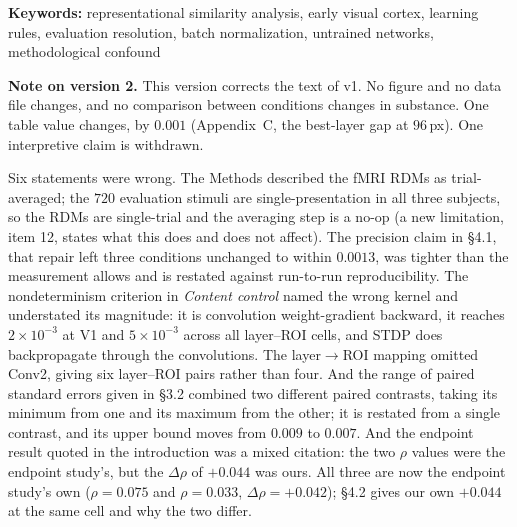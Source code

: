 \documentclass[10pt,twocolumn]{article}
\begin{document}
\begin{abstract}
data alone and is independent of any model; the second is specific to RSA on globally pooled features, and a fitted readout on the full feature map might place the models higher. What the pair bounds, then, is what this style of comparison can resolve at V1 in this dataset, not model--brain alignment in general. In this setting, the one learning effect that holds across resolution is backprop above untrained, at a higher area (LOC). Comparisons of learning rules or architectures at early visual cortex therefore need to control, and report, the evaluation resolution.
\end{abstract}

\textbf{Keywords:} representational similarity analysis, early visual cortex, learning rules, evaluation resolution, batch normalization, untrained networks, methodological confound

\textbf{Note on version 2.} This version corrects the text of v1. No figure and no data file changes, and no comparison between conditions changes in substance. One table value changes, by $0.001$ (Appendix~C, the best-layer gap at $96$\,px). One interpretive claim is withdrawn.

Six statements were wrong. The Methods described the fMRI RDMs as trial-averaged; the $720$ evaluation stimuli are single-presentation in all three subjects, so the RDMs are single-trial and the averaging step is a no-op (a new limitation, item 12, states what this does and does not affect). The precision claim in \S4.1, that repair left three conditions unchanged to within $0.0013$, was tighter than the measurement allows and is restated against run-to-run reproducibility. The nondeterminism criterion in \emph{Content control} named the wrong kernel and understated its magnitude: it is convolution weight-gradient backward, it reaches $2\times10^{-3}$ at V1 and $5\times10^{-3}$ across all layer--ROI cells, and STDP does backpropagate through the convolutions. The layer$\to$ROI mapping omitted Conv2, giving six layer--ROI pairs rather than four. And the range of paired standard errors given in \S3.2 combined two different paired contrasts, taking its minimum from one and its maximum from the other; it is restated from a single contrast, and its upper bound moves from $0.009$ to $0.007$. And the endpoint result quoted in the introduction was a mixed citation: the two $\rho$ values were the endpoint study's, but the $\Delta\rho$ of $+0.044$ was ours. All three are now the endpoint study's own ($\rho = 0.075$ and $\rho = 0.033$, $\Delta\rho = +0.042$); \S4.2 gives our own $+0.044$ at the same cell and why the two differ.
\end{document}

